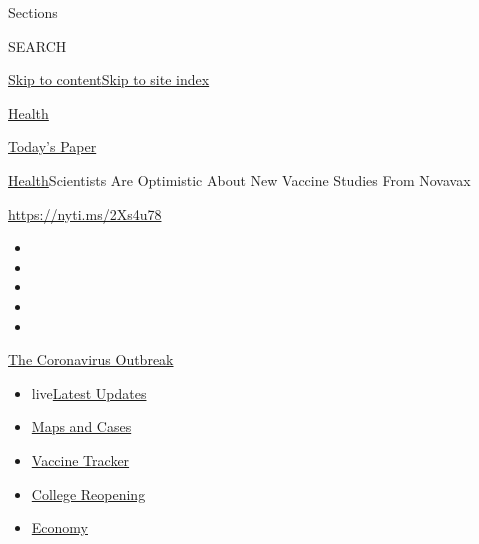 Sections

SEARCH

\protect\hyperlink{site-content}{Skip to
content}\protect\hyperlink{site-index}{Skip to site index}

\href{https://www.nytimes3xbfgragh.onion/section/health}{Health}

\href{https://myaccount.nytimes3xbfgragh.onion/auth/login?response_type=cookie\&client_id=vi}{}

\href{https://www.nytimes3xbfgragh.onion/section/todayspaper}{Today's
Paper}

\href{/section/health}{Health}\textbar{}Scientists Are Optimistic About
New Vaccine Studies From Novavax

\url{https://nyti.ms/2Xs4u78}

\begin{itemize}
\item
\item
\item
\item
\item
\end{itemize}

\href{https://www.nytimes3xbfgragh.onion/news-event/coronavirus?action=click\&pgtype=Article\&state=default\&region=TOP_BANNER\&context=storylines_menu}{The
Coronavirus Outbreak}

\begin{itemize}
\tightlist
\item
  live\href{https://www.nytimes3xbfgragh.onion/2020/08/04/world/coronavirus-cases.html?action=click\&pgtype=Article\&state=default\&region=TOP_BANNER\&context=storylines_menu}{Latest
  Updates}
\item
  \href{https://www.nytimes3xbfgragh.onion/interactive/2020/us/coronavirus-us-cases.html?action=click\&pgtype=Article\&state=default\&region=TOP_BANNER\&context=storylines_menu}{Maps
  and Cases}
\item
  \href{https://www.nytimes3xbfgragh.onion/interactive/2020/science/coronavirus-vaccine-tracker.html?action=click\&pgtype=Article\&state=default\&region=TOP_BANNER\&context=storylines_menu}{Vaccine
  Tracker}
\item
  \href{https://www.nytimes3xbfgragh.onion/2020/08/02/us/covid-college-reopening.html?action=click\&pgtype=Article\&state=default\&region=TOP_BANNER\&context=storylines_menu}{College
  Reopening}
\item
  \href{https://www.nytimes3xbfgragh.onion/live/2020/08/04/business/stock-market-today-coronavirus?action=click\&pgtype=Article\&state=default\&region=TOP_BANNER\&context=storylines_menu}{Economy}
\end{itemize}

